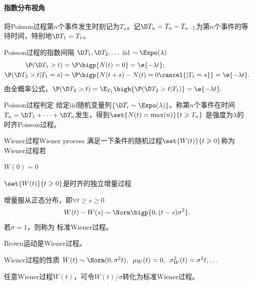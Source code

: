 \paragraph{指数分布视角}
将Poisson过程第$ n $个事件发生时刻记为$ T_n$。记$\D T_n=T_n-T_{n-1} $为第$ n $个事件的等待时间，特别地$\D T_1 = T_1$。
\begin{theorem}{Poisson过程的指数间隔}{}
	$\D T_1,\D T_2,\ldots$ iid $\sim\Expo(\lambda)$
	\begin{align*}
		\P(\D T_1>t)&=\P\bigp{N(t)=0}=\e{-\lambda t};\\
		\P(\D T_2>t|T_1=s)&=\P\bigp{N(t+s)-N(t)=0\cancel{|T_1=s}}=\e{-\lambda t}.
	\end{align*}
	由全概率公式，$\P(\D T_2>t)=\E_{T_1}\bigb{\P(\D T_2>t|T_1)}=\e{-\lambda t}.$
\end{theorem}
\begin{theorem}{Poisson过程判定}{}
	给定iid随机变量列$\{\D T_i\sim\Expo(\lambda)\}$。称第$ n $个事件在时间$T_n =\D T_1 + \cdots +\D T_n $发生，得到$\set{N(t)=\max(n)}{t\geqslant T_n}$
	是强度为$\lambda$的时齐Poisson过程。
\end{theorem}
\begin{definition}{Wiener过程}{Wiener process}
	满足一下条件的随机过程$\set{W(t)}{t\geqslant 0}$称为Wiener过程若
	\begin{compactitem}
		\item $W(0)=0$
		\item $\set{W(t)}{t\geqslant 0}$是时齐的独立增量过程
		\item 增量服从正态分布，即$\forall t\geqslant s\geqslant 0$
		\[
			W(t)-W(s)\sim\Norm\bigp{0,(t-s)\sigma^2}.
		\]
		若$\sigma=1$，则称为 标准Wiener过程。
	\end{compactitem}
\end{definition}
Brown运动是Wiener过程。
\begin{theorem}{Wiener过程的性质}{}
	$W(t)\sim\Norm(0,\sigma^2t),\enspace\mu_W(t)=0,\enspace\sigma^2_W(t)=\sigma^2t,\ldots$%
\end{theorem}
任意Wiener过程$W(t)$，可令$W(t)/\sigma$转化为标准Wiener过程。

